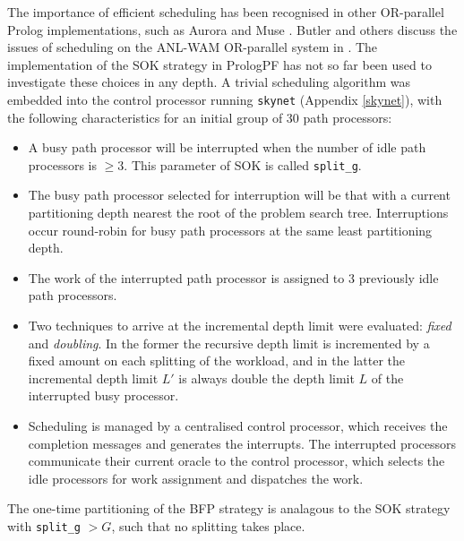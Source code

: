 The importance of efficient scheduling has been recognised in other OR-parallel
Prolog implementations, such as Aurora \cite{Bea91} and Muse \cite{Ali87}. Butler
and others discuss the issues of scheduling on the
ANL-WAM OR-parallel system in \cite{BDLO+88}.
The implementation of the SOK strategy in PrologPF has not so far been used to 
investigate these choices in any depth.  A trivial scheduling algorithm was
embedded into the control processor running \texttt{skynet} (Appendix \ref{skynet}),
with the following characteristics for an initial group of 30 path processors:
\begin{itemize}
\item{A busy path processor will be interrupted when the number of idle path processors
  is $\geq 3$.  This parameter of SOK is called \texttt{split\_{}g}.}
\item{The busy path processor selected for interruption will be that with a current
  partitioning depth nearest the
  root of the problem search tree.  Interruptions occur round-robin for busy path
  processors at the same least partitioning depth.}
\item{The work of the interrupted path processor is assigned to 3 previously idle
  path processors.}
\item{Two techniques to arrive at the incremental depth limit were evaluated:
  \textit{fixed} and \textit{doubling}.  In the former the recursive depth limit
  is incremented by a fixed amount on each splitting of the workload, and in the
  latter the incremental depth limit $L'$ is always double the depth limit $L$
  of the interrupted busy processor.}
\item{Scheduling is managed by a centralised control processor, which 
  receives the completion messages and generates
  the interrupts.
  The interrupted processors communicate their current oracle to the control
  processor, which selects the idle processors for work assignment and
  dispatches the work.}
\end{itemize}

The one-time partitioning of the BFP strategy is analagous
to the SOK strategy with
\texttt{split\_{}g} $> G$, such that no splitting takes place.


